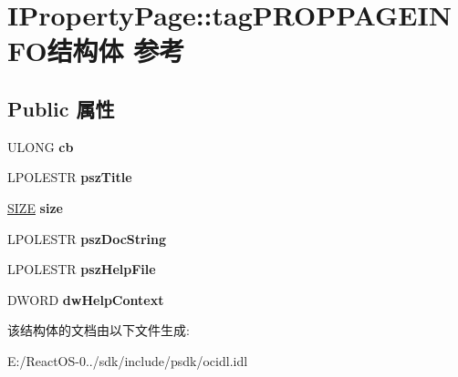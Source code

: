 \hypertarget{struct_i_property_page_1_1tag_p_r_o_p_p_a_g_e_i_n_f_o}{}\section{I\+Property\+Page\+:\+:tag\+P\+R\+O\+P\+P\+A\+G\+E\+I\+N\+F\+O结构体 参考}
\label{struct_i_property_page_1_1tag_p_r_o_p_p_a_g_e_i_n_f_o}
\subsection*{Public 属性}
\begin{DoxyCompactItemize}
\item 
\mbox{\label{struct_i_property_page_1_1tag_p_r_o_p_p_a_g_e_i_n_f_o_a5d09308cad22be38d138ed2328f95ce6}} 
U\+L\+O\+NG {\bfseries cb}
\item 
\mbox{\label{struct_i_property_page_1_1tag_p_r_o_p_p_a_g_e_i_n_f_o_a0bbe88bd8ac47ddeba20145fb4386e0f}} 
L\+P\+O\+L\+E\+S\+TR {\bfseries psz\+Title}
\item 
\mbox{\label{struct_i_property_page_1_1tag_p_r_o_p_p_a_g_e_i_n_f_o_a16809a11f3ad99abdb89498475e94c03}} 
\hyperlink{structtag_s_i_z_e}{S\+I\+ZE} {\bfseries size}
\item 
\mbox{\label{struct_i_property_page_1_1tag_p_r_o_p_p_a_g_e_i_n_f_o_abafe9612e6bfab4fdbea3d36d508f6a1}} 
L\+P\+O\+L\+E\+S\+TR {\bfseries psz\+Doc\+String}
\item 
\mbox{\label{struct_i_property_page_1_1tag_p_r_o_p_p_a_g_e_i_n_f_o_aa05aacbcbfde05f794dfb787c287ed93}} 
L\+P\+O\+L\+E\+S\+TR {\bfseries psz\+Help\+File}
\item 
\mbox{\label{struct_i_property_page_1_1tag_p_r_o_p_p_a_g_e_i_n_f_o_a7b0411d270c5a72f0ca6a6bbb6da49b9}} 
D\+W\+O\+RD {\bfseries dw\+Help\+Context}
\end{DoxyCompactItemize}


该结构体的文档由以下文件生成\+:\begin{DoxyCompactItemize}
\item 
E\+:/\+React\+O\+S-\/0../sdk/include/psdk/ocidl.\+idl\end{DoxyCompactItemize}
